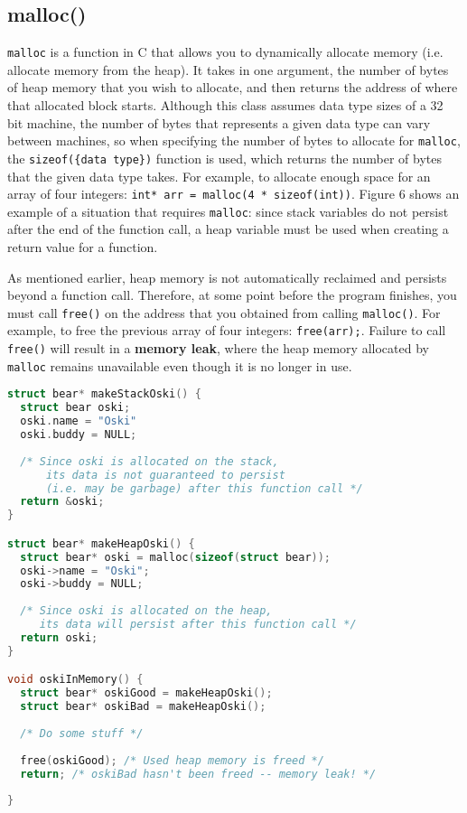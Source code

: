 \documentclass{article}
\begin{document}
\subsection{malloc()}
\texttt{malloc} is a function in C that allows you to dynamically allocate memory (i.e. allocate memory from the heap). It takes in one argument, the number of bytes of heap memory that you wish to allocate, and then returns the address of where that allocated block starts. Although this class assumes data type sizes of a 32 bit machine, the number of bytes that represents a given data type can vary between machines, so when specifying the number of bytes to allocate for \texttt{malloc}, the \texttt{sizeof(\{data type\})} function is used, which returns the number of bytes that the given data type takes. For example, to allocate enough space for an array of four integers: \texttt{int* arr = malloc(4 * sizeof(int))}. Figure 6 shows an example of a situation that requires \texttt{malloc}: since stack variables do not persist after the end of the function call, a heap variable must be used when creating a return value for a function. 

As mentioned earlier, heap memory is not automatically reclaimed and persists beyond a function call. Therefore, at some point before the program finishes, you must call \texttt{free()} on the address that you obtained from calling \texttt{malloc()}. For example, to free the previous array of four integers: \texttt{free(arr);}. Failure to call \texttt{free()} will result in a \textbf{memory leak}, where the heap memory allocated by \texttt{malloc} remains unavailable even though it is no longer in use.
\begin{center}
\renewcommand{\ttdefault}{pcr}
\begin{lstlisting}[language=C, basicstyle=\ttfamily,  keywordstyle=\bfseries, showstringspaces=false]
struct bear* makeStackOski() {
  struct bear oski;
  oski.name = "Oski"
  oski.buddy = NULL;
  
  /* Since oski is allocated on the stack, 
      its data is not guaranteed to persist 
      (i.e. may be garbage) after this function call */
  return &oski; 
}

struct bear* makeHeapOski() {
  struct bear* oski = malloc(sizeof(struct bear));
  oski->name = "Oski";
  oski->buddy = NULL;
  
  /* Since oski is allocated on the heap,
     its data will persist after this function call */
  return oski;
}

void oskiInMemory() {
  struct bear* oskiGood = makeHeapOski();
  struct bear* oskiBad = makeHeapOski();
  
  /* Do some stuff */
  
  free(oskiGood); /* Used heap memory is freed */
  return; /* oskiBad hasn't been freed -- memory leak! */
  
}
\end{lstlisting}
\end{center}
\end{document}
